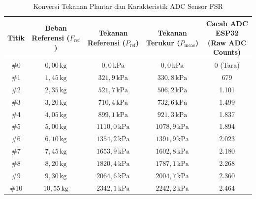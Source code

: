 \begin{table}[htbp]
\centering
\caption{Konversi Tekanan Plantar dan Karakteristik ADC Sensor FSR}
\label{tab:test02_fsr_pressure}
\small
\setlength{\tabcolsep}{6pt}
\begin{tabular}{|c|c|c|c|c|}
\hline
\textbf{Titik} & \shortstack{\textbf{Beban Referensi} \\ \textbf{($F_{\mathrm{ref}}$)}} & \shortstack{\textbf{Tekanan Referensi} \\ \textbf{($P_{\mathrm{ref}}$)}} & \shortstack{\textbf{Tekanan Terukur} \\ \textbf{($P_{\mathrm{meas}}$)}} & \shortstack{\textbf{Cacah ADC ESP32} \\ \textbf{(Raw ADC Counts)}} \\ \hline
\#0 & $0{,}00\,\mathrm{kg}$ & $0{,}0\,\mathrm{kPa}$ & $0{,}0\,\mathrm{kPa}$ & 0 (Tara) \\ \hline
\#1 & $1{,}45\,\mathrm{kg}$ & $321{,}9\,\mathrm{kPa}$ & $330{,}8\,\mathrm{kPa}$ & 679 \\ \hline
\#2 & $2{,}35\,\mathrm{kg}$ & $521{,}7\,\mathrm{kPa}$ & $506{,}2\,\mathrm{kPa}$ & 1.101 \\ \hline
\#3 & $3{,}20\,\mathrm{kg}$ & $710{,}4\,\mathrm{kPa}$ & $732{,}6\,\mathrm{kPa}$ & 1.499 \\ \hline
\#4 & $4{,}05\,\mathrm{kg}$ & $899{,}1\,\mathrm{kPa}$ & $921{,}3\,\mathrm{kPa}$ & 1.837 \\ \hline
\#5 & $5{,}00\,\mathrm{kg}$ & $1110{,}0\,\mathrm{kPa}$ & $1078{,}9\,\mathrm{kPa}$ & 1.894 \\ \hline
\#6 & $6{,}10\,\mathrm{kg}$ & $1354{,}2\,\mathrm{kPa}$ & $1391{,}9\,\mathrm{kPa}$ & 2.023 \\ \hline
\#7 & $7{,}45\,\mathrm{kg}$ & $1653{,}9\,\mathrm{kPa}$ & $1602{,}8\,\mathrm{kPa}$ & 2.180 \\ \hline
\#8 & $8{,}20\,\mathrm{kg}$ & $1820{,}4\,\mathrm{kPa}$ & $1787{,}1\,\mathrm{kPa}$ & 2.268 \\ \hline
\#9 & $9{,}30\,\mathrm{kg}$ & $2064{,}6\,\mathrm{kPa}$ & $2004{,}7\,\mathrm{kPa}$ & 2.360 \\ \hline
\#10 & $10{,}55\,\mathrm{kg}$ & $2342{,}1\,\mathrm{kPa}$ & $2242{,}2\,\mathrm{kPa}$ & 2.464 \\ \hline
\end{tabular}
\end{table}

